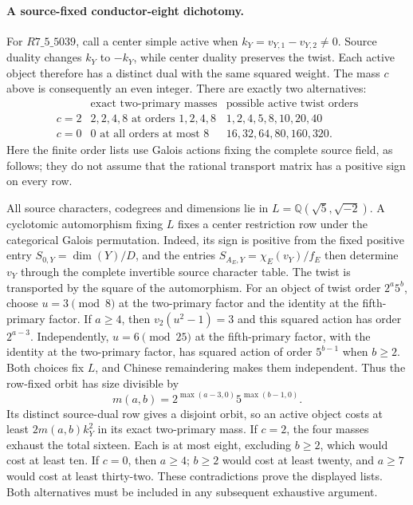 \paragraph{A source-fixed conductor-eight dichotomy.}
For $R7\_5\_5039$, call a center simple active when
$k_Y=v_{Y,1}-v_{Y,2}\ne0$.  Source duality changes $k_Y$ to $-k_Y$,
while center duality preserves the twist.  Each active object therefore
has a distinct dual with the same squared weight.  The mass $c$ above
is consequently an even integer.  There are exactly two alternatives:
\[
\begin{array}{c|l|l}
 &\text{exact two-primary masses}&\text{possible active twist orders}\\\hline
c=2&2,2,4,8\text{ at orders }1,2,4,8&1,2,4,5,8,10,20,40\\
c=0&0\text{ at all orders at most }8&16,32,64,80,160,320.
\end{array}
\]
Here the finite order lists use Galois actions fixing the complete
source field, as follows; they do not assume that the rational
transport matrix has a positive sign on every row.

All source characters, codegrees and dimensions lie in
$L=\mathbb Q(\sqrt5,\sqrt{-2})$.  A cyclotomic automorphism fixing
$L$ fixes a center restriction row under the categorical Galois
permutation.  Indeed, its sign is positive from the fixed positive
entry $S_{0,Y}=\dim(Y)/D$, and the entries
$S_{A_E,Y}=\chi_E(v_Y)/f_E$ then determine $v_Y$ through the complete
invertible source character table.  The twist is transported by the
square of the automorphism.  For an object of twist order $2^a5^b$,
choose $u=3\pmod8$ at the two-primary factor and the identity at the
fifth-primary factor.  If $a\geq4$, then
$v_2(u^2-1)=3$ and this squared action has order $2^{a-3}$.
Independently, $u=6\pmod{25}$ at the fifth-primary factor, with the
identity at the two-primary factor, has squared action of order
$5^{b-1}$ when $b\geq2$.  Both choices fix $L$, and Chinese
remaindering makes them independent.  Thus the row-fixed orbit has
size divisible by
\[
 m(a,b)=2^{\max(a-3,0)}5^{\max(b-1,0)}.
\]
Its distinct source-dual row gives a disjoint orbit, so an active
object costs at least $2m(a,b)k_Y^2$ in its exact two-primary mass.
If $c=2$, the four masses exhaust the total sixteen.  Each is at
most eight, excluding $b\geq2$, which would cost at least ten.
If $c=0$, then $a\geq4$; $b\geq2$ would cost at least twenty,
and $a\geq7$ would cost at least thirty-two.  These contradictions
prove the displayed lists. Both alternatives must be included in any
subsequent exhaustive argument.

